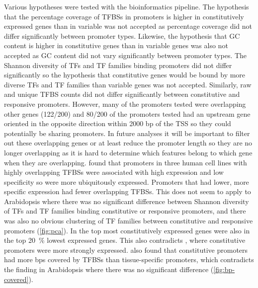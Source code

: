 Various hypotheses were tested with the bioinformatics pipeline. The hypothesis that the percentage coverage of TFBSs in promoters is higher in constitutively expressed genes than in variable was not accepted as percentage coverage did not differ significantly between promoter types.
Likewise, the hypothesis that  GC content is higher in constitutive genes than in variable genes was also not accepted as GC content did not vary significantly between promoter types. 
The Shannon diversity of TFs and TF families binding promoters did not differ significantly so the hypothesis that constitutive genes would be bound by more diverse TFs and TF families than variable genes was not accepted.
Similarly, raw and unique TFBS counts did not differ significantly between constitutive and responsive promoters.
However, many of the promoters tested were overlapping other genes (122/200) and 80/200 of the promoters tested had an upstream gene oriented in the opposite direction within 2000 bp of the TSS so they could potentially be sharing promoters.
In future analyses it will be important to filter out these overlapping genes or at least reduce the promoter length so they are no longer overlapping as it is hard to determine which features belong to which gene when they are overlapping.
\textcite*{mattioliHighthroughputFunctionalAnalysis2019} found that promoters in three human cell lines with highly overlapping TFBSs were associated with high
expression and low specificity so were more ubiquitously expressed.
Promoters that had lower, more specific expression had fewer overlapping TFBSs. This does not seem to apply to Arabidopsis where there was no significant difference between Shannon diversity of TFs and TF families binding constitutive or responsive promoters, and there was also no obvious clustering of TF families between constitutive and responsive promoters (\autoref{fig:pca}).
In \textcite*{czechowskiGenomeWideIdentificationTesting2005} the top most constitutively expressed genes were also in the top \SI{20}{\percent} lowest expressed genes. 
This also contradicts \textcite*{mattioliHighthroughputFunctionalAnalysis2019}, where constitutive promoters were more strongly expressed.
\textcite*{mattioliHighthroughputFunctionalAnalysis2019} also found that constitutive promoters had more bps covered by TFBSs than tissue\hyp{}specific promoters, which contradicts the finding in Arabidopsis where there was no significant difference (\autoref{fig:bp-covered}).

